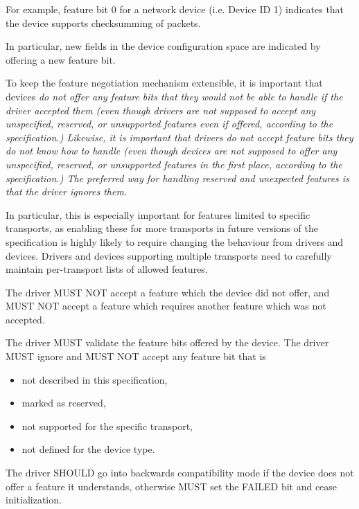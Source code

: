 \begin{note}
For example, feature bit 0 for a network device (i.e.
Device ID 1) indicates that the device supports checksumming of
packets.
\end{note}

In particular, new fields in the device configuration space are
indicated by offering a new feature bit.

To keep the feature negotiation mechanism extensible, it is
important that devices \em{do not} offer any feature bits that
they would not be able to handle if the driver accepted them
(even though drivers are not supposed to accept any unspecified,
reserved, or unsupported features even if offered, according to
the specification.) Likewise, it is important that drivers \em{do
not} accept feature bits they do not know how to handle (even
though devices are not supposed to offer any unspecified,
reserved, or unsupported features in the first place,
according to the specification.) The preferred
way for handling reserved and unexpected features is that the
driver ignores them.

In particular, this is
especially important for features limited to specific transports,
as enabling these for more transports in future versions of the
specification is highly likely to require changing the behaviour
from drivers and devices.  Drivers and devices supporting
multiple transports need to carefully maintain per-transport
lists of allowed features.

The driver MUST NOT accept a feature which the device did not offer,
and MUST NOT accept a feature which requires another feature which was
not accepted.

The driver MUST validate the feature bits offered by the device.
The driver MUST ignore and MUST NOT accept any feature bit that is
\begin{itemize}
\item not described in this specification,
\item marked as reserved,
\item not supported for the specific transport,
\item not defined for the device type.
\end{itemize}

The driver SHOULD go into backwards compatibility mode
if the device does not offer a feature it understands, otherwise MUST
set the FAILED  bit and cease initialization.

